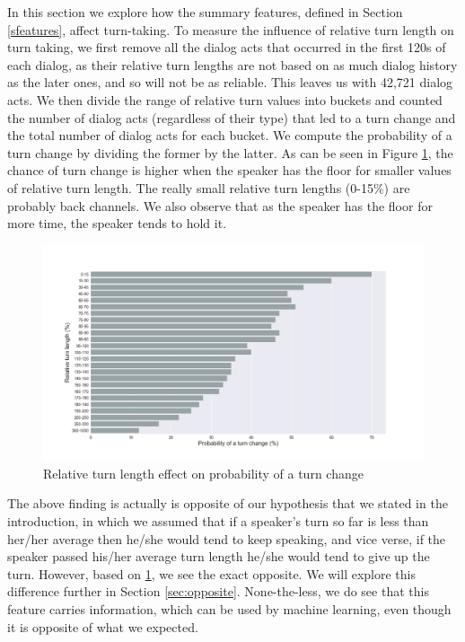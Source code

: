 In this section we explore how the summary features, defined in Section \ref{sfeatures}, affect turn-taking.
To measure the influence of relative turn length on turn taking, we first remove all the dialog acts that occurred in the first 120s of each dialog, as their relative turn lengths are not based on as much dialog history as the later ones, and so will not be as reliable.
%
This leaves us with 42,721 dialog acts. We then divide the range of relative turn values into buckets and counted the number of dialog acts (regardless of their type) that led to a turn change and the total number of dialog acts for each bucket.
We compute the probability of a turn change by dividing the former by the latter. As can be seen in Figure \ref {fig:rtl:turn}, the chance of turn change is higher when the speaker has the floor for smaller values of relative turn length.  The really small relative turn lengths (0-15\%) are probably back channels. We also observe that as the speaker has the floor for more time, the speaker tends to hold it.
%
\begin{figure}[ht!]
\centering
\includegraphics[width=\textwidth]{../scikitlearn/figures/f5.png}\vspace{-1em}
\caption{Relative turn length effect on probability of a turn change}
\label{fig:rtl:turn}
\end{figure}

The above finding is actually is opposite of our hypothesis that we stated in the introduction, in which we assumed that if a speaker's turn so far is less than her/her average then he/she would tend to keep speaking, and vice verse, if the speaker passed his/her average turn length he/she would tend to give up the turn. However, based on \ref {fig:rtl:turn}, we see the exact opposite.   We will explore this difference further in Section \ref{sec:opposite}.  None-the-less, we do see that this feature carries information, which can be used by machine learning, even though it is opposite of what we expected.


